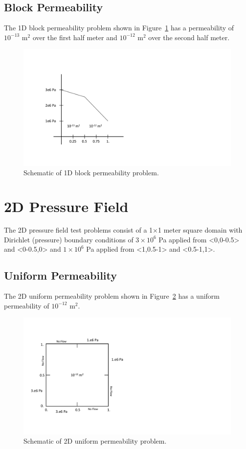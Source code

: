 \documentclass{article}
\begin{document}
\subsection{Block Permeability}
The 1D block permeability problem shown in Figure~\ref{fig:1d_block} has a permeability of $10^{-13}$ m$^2$ over the first half meter and $10^{-12}$ m$^2$ over the second half meter.
\begin{figure}[htbp]
  \centering
  \includegraphics[width=0.8\linewidth]{figs/1d_block}
  \caption{Schematic of 1D block permeability problem.}
  \label{fig:1d_block}
\end{figure}

\newpage
\section{2D Pressure Field}
The 2D pressure field test problems consist of a 1$\times$1 meter square domain with Dirichlet (pressure) boundary conditions of $3\times 10^{6}$ Pa applied from <0,0-0.5> and <0-0.5,0> and $1\times 10^{6}$ Pa applied from <1,0.5-1> and <0.5-1,1>. 

\subsection{Uniform Permeability}
The 2D uniform permeability problem shown in Figure~\ref{fig:2d_uniform} has a uniform permeability of $10^{-12}$ m$^2$.
\begin{figure}[htbp]
  \centering
  \includegraphics[width=0.9\linewidth]{figs/2d_uniform.pdf}
  \caption{Schematic of 2D uniform permeability problem.}
  \label{fig:2d_uniform}
\end{figure}
\end{document}
